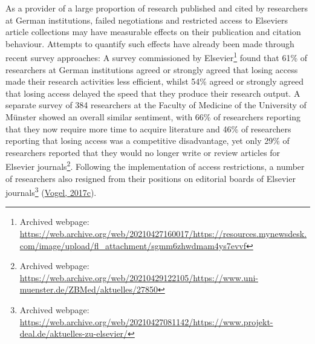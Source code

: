 \documentclass[
]{article}
\begin{document}
As a provider of a large proportion of research published and cited by researchers at German institutions, failed negotiations and restricted access to Elsevier\textquotesingle s article collections may have measurable effects on their publication and citation behaviour. Attempts to quantify such effects have already been made through recent survey approaches: A survey commissioned by Elsevier\footnote{Archived webpage: \url{https://web.archive.org/web/20210427160017/https://resources.mynewsdesk.com/image/upload/fl_attachment/sgmm6zhwdmam4ys7evvf}} found that 61\% of researchers at German institutions agreed or strongly agreed that losing access made their research activities less efficient, whilst 54\% agreed or strongly agreed that losing access delayed the speed that they produce their research output. A separate survey of 384 researchers at the Faculty of Medicine of the University of Münster showed an overall similar sentiment, with 66\% of researchers reporting that they now require more time to acquire literature and 46\% of researchers reporting that losing access was a competitive disadvantage, yet only 29\% of researchers reported that they would no longer write or review articles for Elsevier journals\footnote{Archived webpage: \url{https://web.archive.org/web/20210429122105/https://www.uni-muenster.de/ZBMed/aktuelles/27850}}. Following the implementation of access restrictions, a number of researchers also resigned from their positions on editorial boards of Elsevier journals\footnote{Archived webpage: \url{https://web.archive.org/web/20210427081142/https://www.projekt-deal.de/aktuelles-zu-elsevier/}} (\href{https://doi.org/10.1126/science.aar2142}{Vogel, 2017c}).
\end{document}
